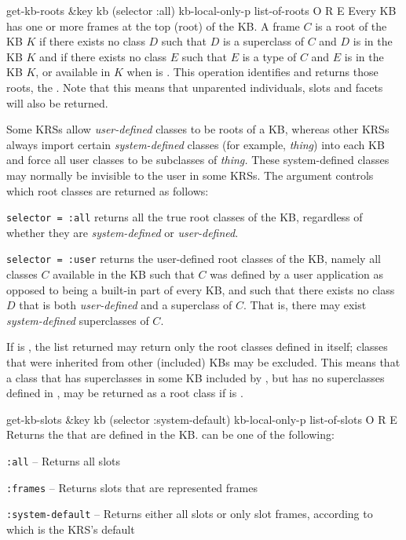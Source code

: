 \begin{okbcop}{get-kb-roots}{ \&key kb (selector :all) kb-local-only-p} { list-of-roots } { O } { R } { E }
Every KB has one or more frames at the top (root) of the
   KB.  A frame $C$ is a root of the KB $K$ if there exists no class $D$ such
   that $D$ is a superclass of $C$ and $D$ is in the KB $K$ and if there
   exists no class $E$ such that $E$ is a type of $C$ and $E$ is in the
   KB $K$, or available in $K$ when  is \false.  This
   operation identifies and returns those roots, the .
   Note that this means that unparented individuals, slots and facets will
   also be returned.

   Some KRSs allow {\em user-defined} classes to be roots of a KB, whereas
   other KRSs always import certain {\em system-defined} classes (for example,
   {\em thing}) into each KB and force all
   user classes to be subclasses of {\em thing.} These system-defined classes
   may normally be invisible to the user in some KRSs.  The
    argument controls which root classes are returned as
   follows:

   \bitem
   \item {\tt selector = :all} returns all the true root classes of the 
          KB, regardless of whether they are {\em system-defined} or 
          {\em user-defined}.
   \item {\tt selector = :user} returns the user-defined
   root classes of the KB, namely all classes $C$ available in the KB such that
   $C$ was defined by a user application as opposed to being a built-in
   part of every KB, and such that there exists no class $D$ that is both
   {\em user-defined} and a superclass of $C$.  That is, there may
   exist {\em system-defined} superclasses of $C$.
   \eitem

   If  is \true, the list returned may return only
   the root classes defined in  itself; classes that were
   inherited from other (included) KBs may be excluded.  This means
   that a class that has superclasses in some KB included by ,
   but has no superclasses defined in , may be returned as a
   root class if  is \true.

\end{okbcop}

\begin{okbcop}{get-kb-slots}{ \&key kb (selector :system-default) kb-local-only-p} { list-of-slots } { O } { R } { E }
Returns the  that are defined in the KB.
    can be one of the following:
   \bitem
   \item {\tt :all} -- Returns all slots
   \item {\tt :frames} -- Returns slots that are represented frames
   \item {\tt :system-default} -- Returns either all slots or
          only slot frames, according to which is the KRS's default
   \eitem
\end{okbcop}

